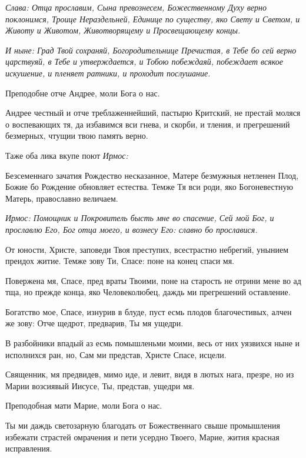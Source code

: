 \itshape Слава\normalfont{}: Отца прославим, Сына превознесем, Божественному Духу верно поклонимся, Троице Нераздельней, Единице по существу, яко Свету и Светом, и Животу и Животом, Животворящему и Просвещающему концы. 

\itshape И ныне\normalfont{}: Град Твой сохраняй, Богородительнице Пречистая, в Тебе бо сей верно царствуяй, в Тебе и утверждается, и Тобою побеждаяй, побеждает всякое искушение, и пленяет ратники, и проходит послушание. 

Преподобне отче Андрее, моли Бога о нас. 

Андрее честный и отче треблаженнейший, пастырю Критский, не престай моляся о воспевающих тя, да избавимся вси гнева, и скорби, и тления, и прегрешений безмерных, чтущии твою память верно. 

Таже оба лика вкупе поют \itshape Ирмос\normalfont{}: 

Безсеменнаго зачатия Рождество несказанное, Матере безмужныя нетленен Плод, Божие бо Рождение обновляет естества. Темже Тя вси роди, яко Богоневестную Матерь, православно величаем. \mychapterending

 

\itshape Ирмос\normalfont{}: Помощник и Покровитель бысть мне во спасение, Сей мой Бог, и прославлю Его, Бог отца моего, и вознесу Его: славно бо прославися. 

От юности, Христе, заповеди Твоя преступих, всестрастно небрегий, унынием преидох житие. Темже зову Ти, Спасе: поне на конец спаси мя. 

Повержена мя, Спасе, пред враты Твоими, поне на старость не отрини мене во ад тща, но прежде конца, яко Человеколюбец, даждь ми прегрешений оставление. 

Богатство мое, Спасе, изнурив в блуде, пуст есмь плодов благочестивых, алчен же зову: Отче щедрот, предварив, Ты мя ущедри. 

В разбойники впадый аз есмь помышленьми моими, весь от них уязвихся ныне и исполнихся ран, но, Сам ми представ, Христе Спасе, исцели. 

Священник, мя предвидев, мимо иде, и левит, видя в лютых нага, презре, но из Марии возсиявый Иисусе, Ты, представ, ущедри мя. 

Преподобная мати Марие, моли Бога о нас. 

Ты ми даждь светозарную благодать от Божественнаго свыше промышления избежати страстей омрачения и пети усердно Твоего, Марие, жития красная исправления. 

